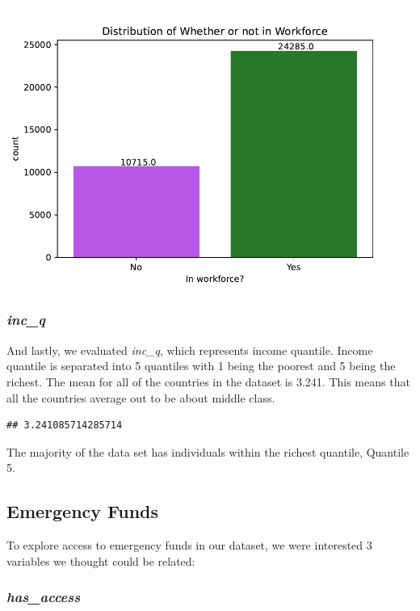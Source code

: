 \documentclass[water,article,submit,moreauthors,pdftex]{mdpi}
\begin{document}
\includegraphics{term_paper_files/figure-latex/unnamed-chunk-12-9.pdf}

\hypertarget{inc_q}{%
\subsubsection{\texorpdfstring{\emph{inc\_q}}{inc\_q}}\label{inc_q}}

And lastly, we evaluated \emph{inc\_q}, which represents income
quantile. Income quantile is separated into 5 quantiles with 1 being the
poorest and 5 being the richest. The mean for all of the countries in
the dataset is 3.241. This means that all the countries average out to
be about middle class.

\begin{verbatim}
## 3.241085714285714
\end{verbatim}

The majority of the data set has individuals within the richest
quantile, Quantile 5.

\hypertarget{emergency-funds}{%
\subsection{Emergency Funds}\label{emergency-funds}}

To explore access to emergency funds in our dataset, we were interested
3 variables we thought could be related:

\hypertarget{has_access}{%
\subsubsection{\texorpdfstring{\emph{has\_access}}{has\_access}}\label{has_access}}
\end{document}
